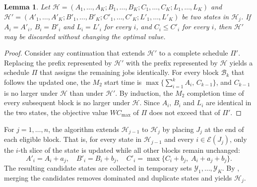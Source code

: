 \documentclass[12pt]{article}
\newtheorem{lemma}{Lemma}[section]
\begin{document}
\begin{sloppypar}
        \begin{lemma}\label{lem:merge-dominance}
            Let $\mathscr{H} = (A_1,\dots,A_K; B_1,\dots,B_K; C_1,\dots,C_K; L_1,\dots,L_K)$ and
            $\mathscr{H}' = (A'_1,\dots,A'_K; B'_1,\dots,B'_K; C'_1,\dots,C'_K; L'_1,\dots,L'_K)$ be two states
            in $\mathscr{H}_j$. If $A_i = A'_i$, $B_i = B'_i$ and $L_i = L'_i$ for every $i$, and
            $C_i \le C'_i$ for every $i$, then $\mathscr{H}'$ may be discarded without changing the optimal
            value.
        \end{lemma}
        \begin{proof}
            Consider any continuation that extends $\mathscr{H}'$ to a complete schedule $\Pi'$. Replacing the
            prefix represented by $\mathscr{H}'$ with the prefix represented by $\mathscr{H}$ yields a schedule
            $\Pi$ that assigns the remaining jobs identically. For every block $\mathcal{B}_k$ that follows the
            updated one, the $M_2$ start time is $\max\{\sum_{i=1}^{k}A_{i},\, C_{k-1}\}$, and $C_{k-1}$ is no
            larger under $\mathscr{H}$ than under $\mathscr{H}'$. By induction, the $M_2$ completion time of
            every subsequent block is no larger under $\mathscr{H}$. Since $A_i$, $B_i$ and $L_i$ are identical
            in the two states, the objective value $W C_{\max}$ of $\Pi$ does not exceed that of $\Pi'$.
        \end{proof}
        
        For $j = 1,\dots,n$, the algorithm extends $\mathscr{H}_{j-1}$ to $\mathscr{H}_j$ by placing $J_j$
        at the end of each eligible block. That is, for every state in $\mathscr{H}_{j-1}$ and every
        $i \in \mathcal{E}(J_j)$, only the $i$-th slice of the state is updated while all other blocks
        remain unchanged:
        \begin{equation}\label{eq:transition}
            A'_i = A_i + a_j,\quad
            B'_i = B_i + b_j,\quad
            C'_i = \max\{C_i + b_j,\; A_i + a_j + b_j\}.
        \end{equation}
        The resulting candidate states are collected in temporary sets $\mathcal{Y}_1,\dots,\mathcal{Y}_K$.
        By , merging the candidates removes dominated and duplicate
        states and yields $\mathscr{H}_{j}$.
        

\end{sloppypar}
\end{document}
